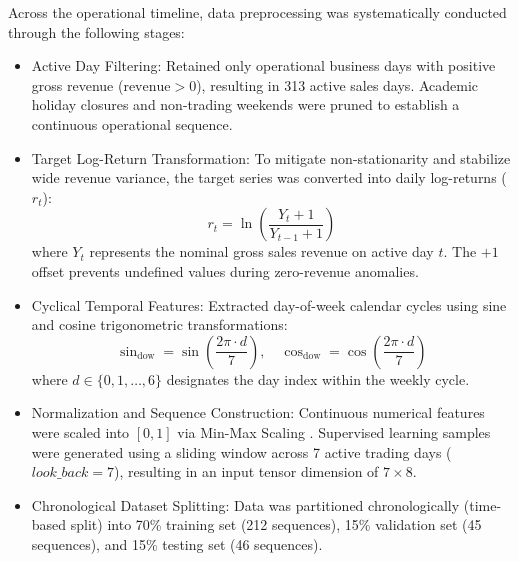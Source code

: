 \documentclass[10pt,a4paper]{article}
\begin{document}
Across the operational timeline, data preprocessing was systematically conducted through the following stages:
\begin{itemize}
  \item Active Day Filtering: Retained only operational business days with positive gross revenue ($\text{revenue} > 0$), resulting in 313 active sales days. Academic holiday closures and non-trading weekends were pruned to establish a continuous operational sequence.
  \item Target Log-Return Transformation: To mitigate non-stationarity and stabilize wide revenue variance, the target series was converted into daily log-returns ($r_t$):
  \begin{equation}
    r_t = \ln\left(\frac{Y_t + 1}{Y_{t-1} + 1}\right)
    \label{eq:log_return}
  \end{equation}
  where $Y_t$ represents the nominal gross sales revenue on active day $t$. The $+1$ offset prevents undefined values during zero-revenue anomalies.
  \item Cyclical Temporal Features: Extracted day-of-week calendar cycles using sine and cosine trigonometric transformations:
  \begin{equation}
    \sin_{\text{dow}} = \sin\left(\frac{2\pi \cdot d}{7}\right), \quad \cos_{\text{dow}} = \cos\left(\frac{2\pi \cdot d}{7}\right)
    \label{eq:dow}
  \end{equation}
  where $d \in \{0, 1, \dots, 6\}$ designates the day index within the weekly cycle.
  \item Normalization and Sequence Construction: Continuous numerical features were scaled into $[0, 1]$ via Min-Max Scaling \cite{pedregosa2011scikit}. Supervised learning samples were generated using a sliding window across 7 active trading days ($look\_back = 7$), resulting in an input tensor dimension of $7 \times 8$.
  \item Chronological Dataset Splitting: Data was partitioned chronologically (time-based split) into 70\% training set (212 sequences), 15\% validation set (45 sequences), and 15\% testing set (46 sequences).
\end{itemize}
\end{document}
